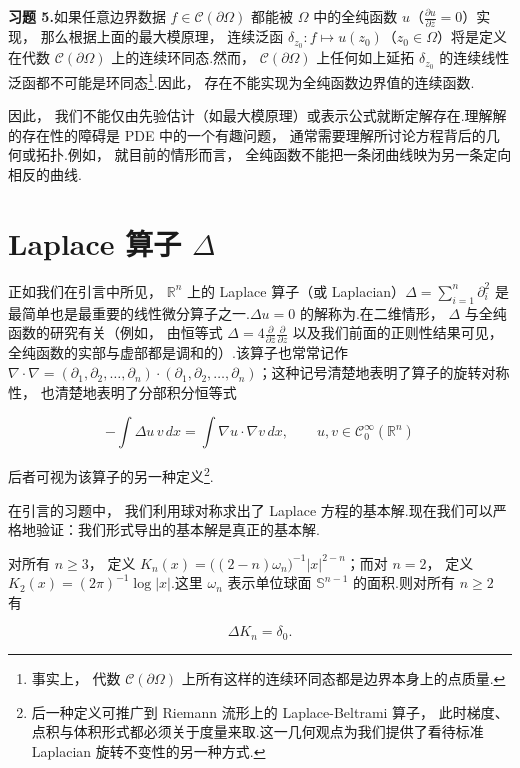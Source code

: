 \noindent\textbf{习题 5.}\quad 如果任意边界数据 $f \in \mathcal{C}(\partial\Omega)$ 都能被 $\Omega$ 中的全纯函数 $u$（$\frac{\partial u}{\partial \bar{z}} = 0$）实现， 那么根据上面的最大模原理， 连续泛函 $\delta_{z_{0}} : f \mapsto u(z_{0})$（$z_{0} \in \Omega$）将是定义在代数 $\mathcal{C}(\partial\Omega)$ 上的连续环同态.然而， $\mathcal{C}(\partial\Omega)$ 上任何如上延拓 $\delta_{z_{0}}$ 的连续线性泛函都不可能是环同态\footnote{事实上， 代数 $\mathcal{C}(\partial\Omega)$ 上所有这样的连续环同态都是边界本身上的点质量.}.因此， 存在不能实现为全纯函数边界值的连续函数.

因此， 我们不能仅由先验估计（如最大模原理）或表示公式就断定解存在.理解解的存在性的障碍是 PDE 中的一个有趣问题， 通常需要理解所讨论方程背后的几何或拓扑.例如， 就目前的情形而言， 全纯函数不能把一条闭曲线映为另一条定向相反的曲线.
\section{Laplace 算子 \texorpdfstring{$\Delta$}{Δ}}

正如我们在引言中所见， $\mathbb{R}^{n}$ 上的 Laplace 算子（或 Laplacian）$\Delta = \sum_{i=1}^{n}\partial_{i}^{2}$ 是最简单也是最重要的线性微分算子之一.$\Delta u = 0$ 的解称为.在二维情形， $\Delta$ 与全纯函数的研究有关（例如， 由恒等式 $\Delta = 4\frac{\partial}{\partial \bar{z}}\frac{\partial}{\partial z}$ 以及我们前面的正则性结果可见， 全纯函数的实部与虚部都是调和的）.该算子也常常记作 $\nabla \cdot \nabla = (\partial_{1}, \partial_{2}, \ldots, \partial_{n}) \cdot (\partial_{1}, \partial_{2}, \ldots, \partial_{n})$；这种记号清楚地表明了算子的旋转对称性， 也清楚地表明了分部积分恒等式

\[
-\int \Delta u\, v\, dx = \int \nabla u \cdot \nabla v\, dx, \qquad u, v \in \mathcal{C}_{0}^{\infty}(\mathbb{R}^{n})
\]

后者可视为该算子的另一种定义\footnote{后一种定义可推广到 Riemann 流形上的 Laplace-Beltrami 算子， 此时梯度、点积与体积形式都必须关于度量来取.这一几何观点为我们提供了看待标准 Laplacian 旋转不变性的另一种方式.}.

在引言的习题中， 我们利用球对称求出了 Laplace 方程的基本解.现在我们可以严格地验证：我们形式导出的基本解是真正的基本解.

\begin{proposition}\label{prop:c4-2.1}
对所有 $n \geq 3$， 定义 $K_{n}(x) = \bigl((2-n)\omega_{n}\bigr)^{-1}|x|^{2-n}$；而对 $n = 2$， 定义 $K_{2}(x) = (2\pi)^{-1}\log|x|$.这里 $\omega_{n}$ 表示单位球面 $\mathbb{S}^{n-1}$ 的面积.则对所有 $n \geq 2$ 有

\[
\Delta K_{n} = \delta_{0}.
\]
\end{proposition}

